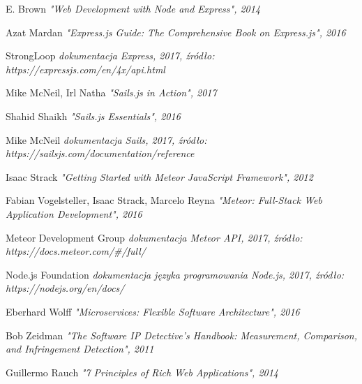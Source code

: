 \documentclass[12pt]{report}
\begin{document}

\begin{thebibliography}{99}
    E. Brown
    \textit{"Web Development with Node and Express", 2014}

    Azat Mardan
    \textit{"Express.js Guide: The Comprehensive Book on Express.js", 2016}

    StrongLoop
    \textit{dokumentacja Express, 2017, źródło: https://expressjs.com/en/4x/api.html}

    Mike McNeil, Irl Natha
    \textit{"Sails.js in Action", 2017}

    Shahid Shaikh
    \textit{"Sails.js Essentials", 2016}

    Mike McNeil
    \textit{dokumentacja Sails, 2017, źródło: https://sailsjs.com/documentation/reference}

    Isaac Strack
    \textit{"Getting Started with Meteor JavaScript Framework", 2012}

    Fabian Vogelsteller, Isaac Strack, Marcelo Reyna
    \textit{"Meteor: Full-Stack Web Application Development", 2016}

    Meteor Development Group
    \textit{dokumentacja Meteor API, 2017, źródło: https://docs.meteor.com/\#/full/}

    Node.js Foundation
    \textit{dokumentacja języka programowania Node.js, 2017, źródło: https://nodejs.org/en/docs/}

    Eberhard Wolff
    \textit{"Microservices: Flexible Software Architecture", 2016}

    Bob Zeidman
    \textit{"The Software IP Detective's Handbook: Measurement, Comparison, and Infringement Detection", 2011}
    
    Guillermo Rauch
    \textit{"7 Principles of Rich Web Applications", 2014}

\end{thebibliography}


\listoffigures
\end{document}
